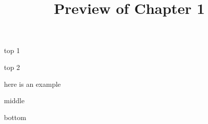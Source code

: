 \documentclass{ximera}
\title{Preview of Chapter 1}
\begin{document}
\begin{abstract}
\end{abstract}

\maketitle



top 1


top 2

\begin{example}
here is an example

\begin{expandable}

\begin{center}
\end{center}

\end{expandable}

\end{example}

middle


\begin{expandable}

\begin{center}
\end{center}

\end{expandable}





bottom
\end{document}
